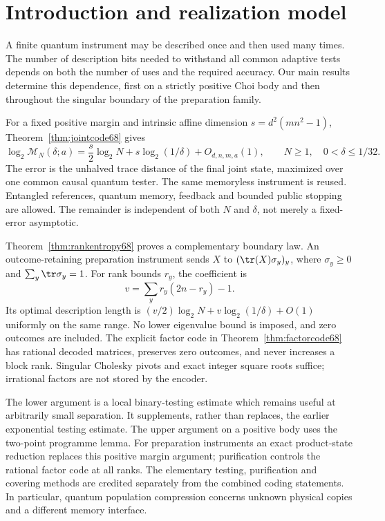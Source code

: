 \section{Introduction and realization model}

A finite quantum instrument may be described once and then used many
times. The number of description bits needed to withstand all common
adaptive tests depends on both the number of uses and the required
accuracy. Our main results determine this dependence, first on a
strictly positive Choi body and then throughout the singular boundary
of the preparation family.

For a fixed positive margin and intrinsic affine dimension
$s=d^2(mn^2-1)$, Theorem~\ref{thm:jointcode68} gives
\[
 \log_2\mathcal M_N(\delta;a)
 =\frac s2\log_2N+s\log_2(1/\delta)+O_{d,n,m,a}(1),
 \qquad N\ge1,\quad 0<\delta\le1/32.
\]
The error is the unhalved trace distance of the final joint state,
maximized over one common causal quantum tester. The same memoryless
instrument is reused. Entangled references, quantum memory, feedback
and bounded public stopping are allowed. The remainder is independent
of both $N$ and $\delta$, not merely a fixed-error asymptotic.

\pagebreak
Theorem~\ref{thm:rankentropy68} proves a complementary boundary law.
An outcome-retaining preparation instrument sends
$X$ to $(\tr(X)\sigma_y)_y$, where $\sigma_y\ge0$ and
$\sum_y\tr\sigma_y=1$. For rank bounds $r_y$, the coefficient is
\[
                  v=\sum_y r_y(2n-r_y)-1.
\]
Its optimal description length is
$(v/2)\log_2N+v\log_2(1/\delta)+O(1)$ uniformly on the same
range. No lower eigenvalue bound is imposed, and zero outcomes are
included. The explicit factor code in Theorem~\ref{thm:factorcode68}
has rational decoded matrices, preserves zero outcomes, and never
increases a block rank. Singular Cholesky pivots and exact integer
square roots suffice; irrational factors are not stored by the encoder.

The lower argument is a local binary-testing estimate which remains
useful at arbitrarily small separation. It supplements, rather than
replaces, the earlier exponential testing estimate. The upper argument
on a positive body uses the two-point programme lemma. For preparation
instruments an exact product-state reduction replaces this positive
margin argument; purification controls the rational factor code at
all ranks. The elementary testing, purification and covering methods
are credited separately from the combined coding statements. In
particular, quantum population compression \cite{YBCH68} concerns
unknown physical copies and a different memory interface.

